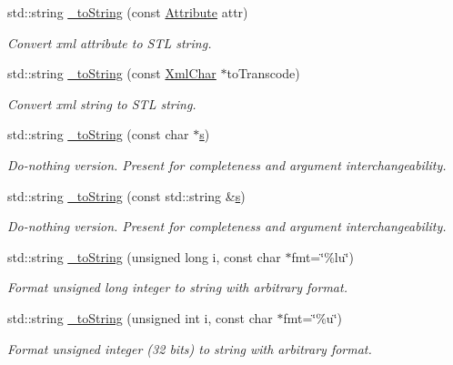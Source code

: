 \begin{DoxyCompactItemize}
std\+::string \hyperlink{group___d_d4_h_e_p___x_m_l_gad2124529d3b80b7896b4d5a370ee906e}{\+\_\+to\+String} (const \hyperlink{namespace_d_d4hep_1_1_x_m_l_a5c19b7116be99d69b4b22d911357baaf}{Attribute} attr)
\begin{DoxyCompactList}\small\item\em Convert xml attribute to S\+TL string. \end{DoxyCompactList}\item 
std\+::string \hyperlink{group___d_d4_h_e_p___x_m_l_ga4c56544a190950d18779b16e986783ab}{\+\_\+to\+String} (const \hyperlink{namespace_d_d4hep_1_1_x_m_l_a09e5d9cc86ed782f6826dfe0778c1815}{Xml\+Char} $\ast$to\+Transcode)
\begin{DoxyCompactList}\small\item\em Convert xml string to S\+TL string. \end{DoxyCompactList}\item 
std\+::string \hyperlink{group___d_d4_h_e_p___x_m_l_ga7a1c3ef4f1a036d3ccccfd9fff8cd30f}{\+\_\+to\+String} (const char $\ast$\hyperlink{_volumes_8cpp_a17ca6bfc8040d695d3cada22a4763d40}{s})
\begin{DoxyCompactList}\small\item\em Do-\/nothing version. Present for completeness and argument interchangeability. \end{DoxyCompactList}\item 
std\+::string \hyperlink{group___d_d4_h_e_p___x_m_l_ga3cc667e7ad6da9a55052498695c44e27}{\+\_\+to\+String} (const std\+::string \&\hyperlink{_volumes_8cpp_a17ca6bfc8040d695d3cada22a4763d40}{s})
\begin{DoxyCompactList}\small\item\em Do-\/nothing version. Present for completeness and argument interchangeability. \end{DoxyCompactList}\item 
std\+::string \hyperlink{group___d_d4_h_e_p___x_m_l_ga52447f7eb531c40682ba02c1271c1030}{\+\_\+to\+String} (unsigned long i, const char $\ast$fmt=\char`\"{}\%lu\char`\"{})
\begin{DoxyCompactList}\small\item\em Format unsigned long integer to string with arbitrary format. \end{DoxyCompactList}\item 
std\+::string \hyperlink{group___d_d4_h_e_p___x_m_l_ga394251d8f037bcee0db303753aefc97b}{\+\_\+to\+String} (unsigned int i, const char $\ast$fmt=\char`\"{}\%u\char`\"{})
\begin{DoxyCompactList}\small\item\em Format unsigned integer (32 bits) to string with arbitrary format. \end{DoxyCompactList}\item 

\end{DoxyCompactItemize}
